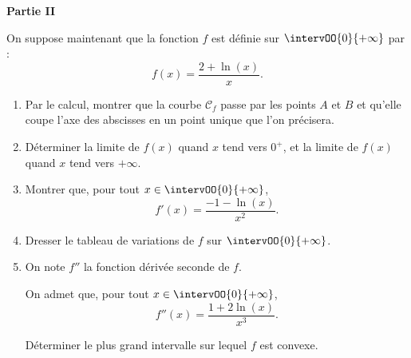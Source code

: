 \textbf{Partie II}

\medskip

On suppose maintenant que la fonction $f$ est définie sur $\intervOO{0}{+\infty}$ par : \[ f(x)=\dfrac{2+\ln(x)}{x}. \]%

\begin{enumerate}
	\item Par le calcul, montrer que la courbe $\mathcal{C}_f$ passe par les points $A$ et $B$ et qu’elle coupe l’axe des abscisses en un point unique que l’on précisera.
	\item Déterminer la limite de $f(x)$ quand $x$ tend vers $0^+$, et la limite de $f(x)$ quand $x$ tend vers $+\infty$.
	\item Montrer que, pour tout $x \in \intervOO{0}{+\infty}$, \[ f'(x)=\dfrac{-1-\ln(x)}{x^2}.\]
	\item Dresser le tableau de variations de $f$ sur $\intervOO{0}{+\infty}$.
	\item On note $f''$ la fonction dérivée seconde de $f$.
	
	On admet que, pour tout $x \in \intervOO{0}{+\infty}$, \[ f''(x)=\dfrac{1+2\ln(x)}{x^3}. \]
	
	Déterminer le plus grand intervalle sur lequel $f$ est convexe.
\end{enumerate}

